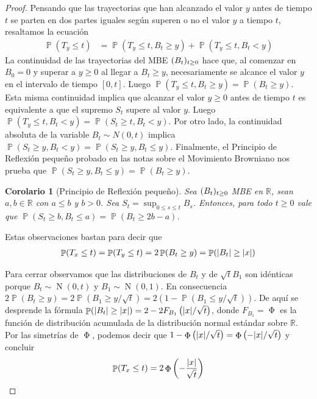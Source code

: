 \documentclass{article}
\DeclareMathOperator{\prob}{\mathbb{P}}
\DeclareMathOperator{\normal}{N}
\DeclareMathOperator{\PhiDistribution}{\Phi}
\newcommand{\realnum}{\mathbb{R}}
\newcommand{\brownian}{B}
\newtheorem{corollary}{Corolario}
\theoremstyle{definition}
\begin{document}
\begin{proof}
Pensando que las trayectorias que han alcanzado el valor \(y\) antes de tiempo \(t\) se parten en dos partes iguales según superen o no el valor \(y\) a tiempo \(t\), resaltamos la ecuación
\begin{align}
	\prob(T_y \leq t)
	&=
	\prob(T_y \leq t, \brownian_t \geq y) + \prob(T_y \leq t, \brownian_t < y)
\end{align}
La continuidad de las trayectorias del MBE \(\brownianProcess\) hace que, al comenzar en \(\brownian_0 = 0\) y superar a \(y \geq 0\) al llegar a \(\brownian_t \geq y\), necesariamente se alcance el valor \(y\) en el intervalo de tiempo \([0, t]\).
Luego \(\prob(T_y \leq t, \brownian_t \geq y) = \prob(\brownian_t \geq y)\).
Esta misma continuidad implica que alcanzar el valor \(y \geq 0\) antes de tiempo \(t\) es equivalente a que el supremo \(S_t\) supere al valor \(y\).
Luego \(\prob(T_y {\leq} t, \brownian_t {<} y) = \prob(S_t {\geq} t, \brownian_t {<} y)\).
Por otro lado, la continuidad absoluta de la variable \(\brownian_t \sim N(0, t)\) implica \(\prob(S_t \geq y, \brownian_t < y) = \prob(S_t \geq y, \brownian_t \leq y)\).
Finalmente, el Principio de Reflexión pequeño probado en las notas sobre el Movimiento Browniano nos prueba que \(\prob(S_t \geq y, \brownian_t \leq y) = \prob(\brownian_t \geq y)\).
\begin{corollary}[Principio de Reflexión pequeño]
\label{corollary:SmallReflectionPrincipleForBrownianMotion}
Sea \(\brownianProcess\) MBE en \(\realnum\), sean \(a, b \in \realnum\) con \(a \leq b\) y \(b > 0\).
Sea \(S_t = \sup_{0 \leq s \leq t} \brownian_s\).
Entonces, para todo \(t \geq 0\) vale que \(\prob(S_t \geq b, \brownian_t \leq a) = \prob(\brownian_t \geq 2 b - a)\).
\end{corollary}
Estas observaciones bastan para decir que
\begin{align}
	\prob(T_x \leq t)
	=
	\prob(T_y \leq t)
	=
	2 \prob(\brownian_t \geq y)
	=
	\prob(\abs{\brownian_t} \geq \abs{x})
\end{align}

Para cerrar observamos que las distribuciones de \(\brownian_t\) y de \(\sqrt{t} \brownian_1\) son idénticas porque \(\brownian_t \sim \normal(0, t)\) y \(\brownian_1 \sim \normal(0, 1)\).
En consecuencia \(2 \prob(\brownian_t \geq y) = 2 \prob \left( \brownian_1 \geq y / \sqrt{t} \right) = 2 \left(1 - \prob \left(\brownian_1 \leq y / \sqrt{t} \right)\right)\).
De aquí se desprende la fórmula \(\prob(\abs{\brownian_t} \geq \abs{x}) = 2 - 2 F_{\brownian_1} \left( \abs{x} / \sqrt{t} \right)\), donde \(F_{\brownian_1} = \PhiDistribution\) es la función de distribución acumulada de la distribución normal estándar sobre \(\realnum\).
Por las simetrías de \(\PhiDistribution\), podemos decir que \(1 - \PhiDistribution \left( \abs{x} / \sqrt{t} \right) = \PhiDistribution \left( - \abs{x} / \sqrt{t} \right)\) y concluir
\begin{align}
	\prob(T_x \leq t)
	=
	2 \PhiDistribution \left( - \frac{\abs{x}}{\sqrt{t}} \right)
\end{align}

\end{proof}
\end{document}
